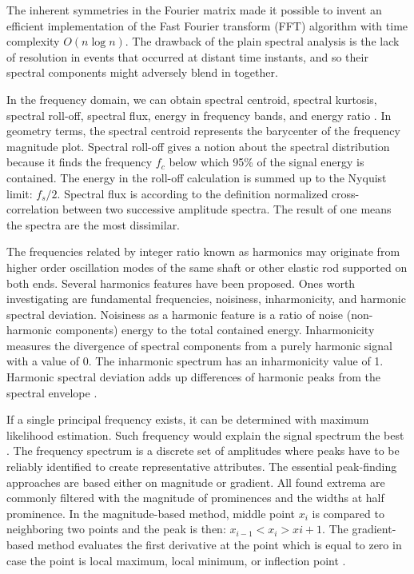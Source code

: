 The inherent symmetries in the Fourier matrix made it possible to invent an efficient implementation of the Fast Fourier transform (FFT) algorithm with time complexity $O(n \log n)$. The drawback of the plain spectral analysis is the lack of resolution in events that occurred at distant time instants, and so their spectral components might adversely blend in together. 

In the frequency domain, we can obtain spectral centroid, spectral kurtosis, spectral roll-off, spectral flux, energy in frequency bands, and energy ratio \cite{peeters_large_2004}. In geometry terms, the spectral centroid represents the barycenter of the frequency magnitude plot. Spectral roll-off gives a notion about the spectral distribution because it finds the frequency $f_c$ below which 95\% of the signal energy is contained. The energy in the roll-off calculation is summed up to the Nyquist limit: $f_s / 2$.  Spectral flux is according to the definition normalized cross-correlation between two successive amplitude spectra. The result of one means the spectra are the most dissimilar.

The frequencies related by integer ratio known as harmonics may originate from higher order oscillation modes of the same shaft or other elastic rod supported on both ends. Several harmonics features have been proposed. Ones worth investigating are fundamental frequencies, noisiness, inharmonicity, and harmonic spectral deviation. Noisiness as a harmonic feature is a ratio of noise (non-harmonic components) energy to the total contained energy. Inharmonicity measures the divergence of spectral components from a purely harmonic signal with a value of 0. The inharmonic spectrum has an inharmonicity value of 1. Harmonic spectral deviation adds up differences of harmonic peaks from the spectral envelope \cite{peeters_large_2004}. 

If a single principal frequency exists, it can be determined with maximum likelihood estimation. Such frequency would explain the signal spectrum the best \cite{peeters_large_2004}.  The frequency spectrum is a discrete set of amplitudes where peaks have to be reliably identified to create representative attributes.
The essential peak-finding approaches are based either on magnitude or gradient. All found extrema are commonly filtered with the magnitude of prominences and the widths at half prominence.  In the magnitude-based method, middle point $x_i$ is compared to neighboring two points and the peak is then: $x_{i−1} < x_i > x{i+1}$. The gradient-based method evaluates the first derivative at the point which is equal to zero in case the point is local maximum, local minimum, or inflection point \cite{adikaram_non-parametric_2016}.

